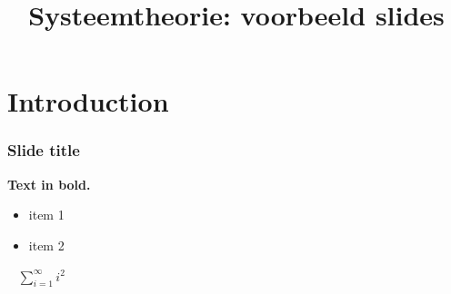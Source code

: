 \documentclass{beamer}
\title{Systeemtheorie: voorbeeld slides}
\begin{document}
\begin{frame}
\titlepage
\end{frame}

\section{Introduction}

\begin{frame}
\frametitle{Slide title}
\textbf{Text in bold.} \\
\begin{itemize}
\item item 1
\item item 2
\end{itemize}
\pause
\ \newline
$\sum_{i=1}^\infty i^2$
\end{frame}
\end{document}
